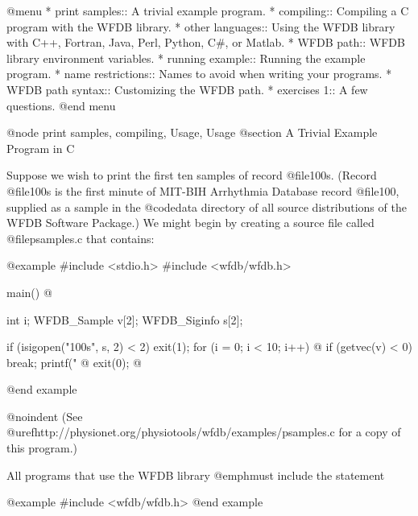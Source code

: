 @menu
* print samples::		A trivial example program.
* compiling::			Compiling a C program with the WFDB library.
* other languages::             Using the WFDB library with C++, Fortran,
                                  Java, Perl, Python, C#, or Matlab.
* WFDB path::			WFDB library environment variables.
* running example::		Running the example program.
* name restrictions::		Names to avoid when writing your programs.
* WFDB path syntax::		Customizing the WFDB path.
* exercises 1::			A few questions.
@end menu

@node     print samples, compiling, Usage, Usage
@section A Trivial Example Program in C

Suppose we wish to print the first ten samples of record @file{100s}.
(Record @file{100s} is the first minute of MIT-BIH Arrhythmia Database
record @file{100}, supplied as a sample in the @code{data} directory of all
source distributions of the WFDB Software Package.)  We might begin by
creating a source file called @file{psamples.c} that contains:

@example
#include <stdio.h>
#include <wfdb/wfdb.h>

main()
@{
    int i;
    WFDB_Sample v[2];
    WFDB_Siginfo s[2];

    if (isigopen("100s", s, 2) < 2)
        exit(1);
    for (i = 0; i < 10; i++) @{
        if (getvec(v) < 0)
            break;
        printf("%
    @}
    exit(0);
@}
@end example

@noindent
(See @uref{http://physionet.org/physiotools/wfdb/examples/psamples.c}
for a copy of this program.)

All programs that use the WFDB library @emph{must} include the
statement

@example
#include <wfdb/wfdb.h>
@end example

